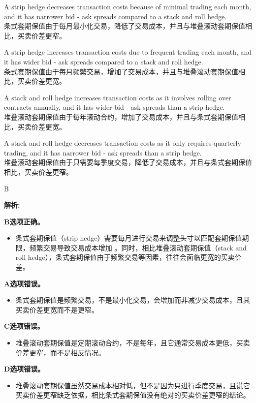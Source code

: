 \documentclass{article}
\newenvironment{explanation}
{\textbf{解析:}\par}
{\par}
\begin{document}
\begin{choices}
    \item A strip hedge decreases transaction costs because of minimal trading each month, and it has narrower bid - ask spreads compared to a stack and roll hedge.\\
    条式套期保值由于每月最小化交易，降低了交易成本，并且与堆叠滚动套期保值相比，买卖价差更窄。
    \item A strip hedge increases transaction costs due to frequent trading each month, and it has wider bid - ask spreads compared to a stack and roll hedge.\\
    条式套期保值由于每月频繁交易，增加了交易成本，并且与堆叠滚动套期保值相比，买卖价差更宽。
    \item A stack and roll hedge increases transaction costs as it involves rolling over contracts annually, and it has wider bid - ask spreads than a strip hedge.\\
    堆叠滚动套期保值由于每年滚动合约，增加了交易成本，并且与条式套期保值相比，买卖价差更宽。
    \item A stack and roll hedge decreases transaction costs as it only requires quarterly trading, and it has narrower bid - ask spreads than a strip hedge.\\
    堆叠滚动套期保值由于只需要每季度交易，降低了交易成本，并且与条式套期保值相比，买卖价差更窄。
\end{choices}

\begin{correctanswer}
    B
\end{correctanswer}

\begin{explanation}
\textbf{B选项正确。}
\begin{itemize}
\item 条式套期保值（strip hedge）需要每月进行交易来调整头寸以匹配套期保值期限，频繁交易导致交易成本增加 。同时，相比堆叠滚动套期保值（stack and roll hedge），条式套期保值由于频繁交易等因素，往往会面临更宽的买卖价差。
\end{itemize}
\textbf{A选项错误。}
\begin{itemize}
\item 条式套期保值是频繁交易，不是最小化交易，会增加而非减少交易成本，且其买卖价差更宽而不是更窄。
\end{itemize}
\textbf{C选项错误。}
\begin{itemize}
\item 堆叠滚动套期保值是定期滚动合约，不是每年，且它通常交易成本更低，买卖价差更窄，而不是相反情况。
\end{itemize}
\textbf{D选项错误。}
\begin{itemize}
\item 堆叠滚动套期保值虽然交易成本相对低，但不是因为只进行季度交易，且说它买卖价差更窄缺乏依据，相比条式套期保值没有绝对的买卖价差更窄的结论。
\end{itemize}
\end{explanation}
\end{document}
